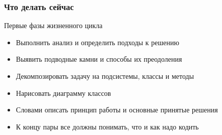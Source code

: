 \documentclass[xetex,mathserif,serif]{beamer}
\begin{document}
	\begin{frame}
		\frametitle{Что делать сейчас}
		Первые фазы жизненного цикла
		\begin{itemize}
			\item Выполнить анализ и определить подходы к решению
			\item Выявить подводные камни и способы их преодоления
			\item Декомпозировать задачу на подсистемы, классы и методы
			\item Нарисовать диаграмму классов
			\item Словами описать принцип работы и основные принятые решения
			\item К концу пары все должны понимать, что и как надо кодить
		\end{itemize}
	\end{frame}
\end{document}

